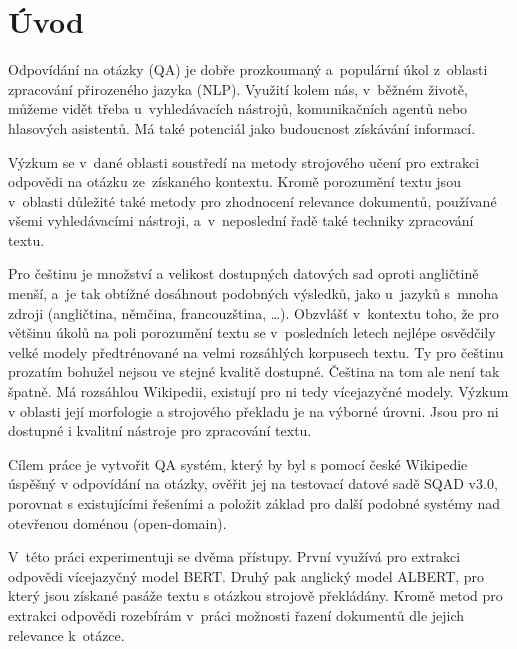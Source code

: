 
\chapter{Úvod}
Odpovídání na otázky (QA) je dobře prozkoumaný a~populární úkol z~oblasti zpracování přirozeného jazyka (NLP). Využití kolem nás, v~běžném životě, můžeme vidět třeba u~vyhledávacích nástrojů, komunikačních agentů nebo hlasových asistentů. Má také potenciál jako budoucnost získávání informací.\par 
Výzkum se v~dané oblasti soustředí na metody strojového učení pro extrakci odpovědi na otázku ze~získaného kontextu. Kromě porozumění textu jsou v~oblasti důležité také metody pro zhodnocení relevance dokumentů, používané všemi vyhledávacími nástroji, a~v~neposlední řadě také techniky zpracování textu.\par
Pro češtinu je množství a velikost dostupných datových sad oproti angličtině menší, a~je tak obtížné dosáhnout podobných výsledků, jako u~jazyků s~mnoha zdroji (angličtina, němčina, francouzština, \dots). Obzvlášť v~kontextu toho, že pro většinu úkolů na poli porozumění textu se v~posledních letech nejlépe osvědčily velké modely předtrénované na velmi rozsáhlých korpusech textu. Ty pro češtinu prozatím bohužel nejsou ve stejné kvalitě dostupné. Čeština na tom ale není tak špatně. Má rozsáhlou Wikipedii, existují pro ni tedy vícejazyčné modely. Výzkum v oblasti její morfologie a strojového překladu je na výborné úrovni. Jsou pro ni dostupné i kvalitní nástroje pro zpracování textu.\par \smallskip

Cílem práce je vytvořit QA systém, který by byl s pomocí české Wikipedie úspěšný v odpovídání na otázky, ověřit jej na testovací datové sadě SQAD v3.0, porovnat s existujícími řešeními a položit základ pro další podobné systémy nad otevřenou doménou (open-domain).\par \smallskip
V~této práci experimentuji se dvěma přístupy. První využívá pro extrakci odpovědi vícejazyčný model BERT. Druhý pak anglický model ALBERT, pro který jsou získané pasáže textu s otázkou strojově překládány. Kromě metod pro extrakci odpovědi rozebírám  v~práci možnosti řazení dokumentů dle jejich relevance k~otázce.\par

